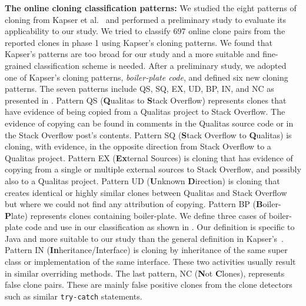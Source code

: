 \documentclass[10pt,journal,compsoc]{IEEEtran}
\begin{document}
\textbf{The online cloning classification patterns:} 
We studied the eight patterns of cloning from Kapser et
al.~\cite{Kapser2006,Kapser2008} and performed a preliminary study to
evaluate its applicability to our study. 
We tried to classify 697 online clone pairs from
the reported clones in phase 1 
using Kapser's cloning patterns. We found that 
Kapser's patterns are too broad for our study and a more suitable and
fine-grained classification scheme is needed. After a preliminary study, we
adopted one of Kapser's cloning patterns, \emph{boiler-plate code}, and defined
six new cloning patterns. The seven patterns include QS, SQ, EX, UD, BP, IN, and
NC as presented in . Pattern QS
(\textbf{Q}ualitas to \textbf{S}tack Overflow) represents clones that have
evidence of being copied from a Qualitas project to Stack Overflow. The evidence
of copying can be found in comments in the Qualitas source code or in the Stack
Overflow post's contents. Pattern SQ (\textbf{S}tack Overflow to
\textbf{Q}ualitas) is cloning, with evidence, in the opposite direction from
Stack Overflow to a Qualitas project. Pattern EX (\textbf{Ex}ternal Sources) is
cloning that has evidence of copying from a single or multiple external sources
to Stack Overflow, and possibly also to a Qualitas project.  Pattern UD
(\textbf{U}nknown \textbf{D}irection) is cloning that creates identical or
highly similar clones between Qualitas and Stack Overflow but where we could not
find any attribution of copying. Pattern BP (\textbf{B}oiler-\textbf{P}late)
represents clones containing boiler-plate. We define three cases of boiler-plate
code and use in our classification as shown in . Our
definition is specific to Java and more suitable to our study than the general
definition in Kapser's~\cite{Kapser2008}.
 Pattern
IN (\textbf{In}heritance/Interface) is cloning by inheritance of the
same super class or implementation of the same interface. These two
activities usually result in similar overriding methods. The last
pattern, NC (\textbf{N}ot \textbf{C}lones), represents
false clone pairs. These are mainly false positive
clones from the clone detectors such as similar
{\small\texttt{try-catch}} statements.
\end{document}
